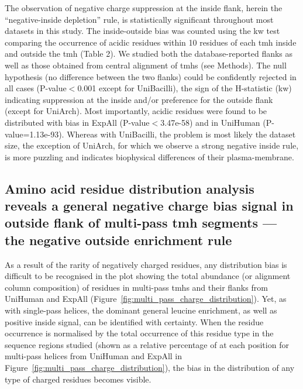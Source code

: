 The observation of negative charge suppression at the inside flank, herein the ``negative-inside depletion'' rule, is statistically significant throughout most datasets in this study. The inside-outside bias was counted using the \gls{kw} test comparing the occurrence of acidic residues within 10 residues of each \gls{tmh} inside and outside the \gls{tmh} (Table 2). We studied both the database-reported flanks as well as those obtained from central alignment of \gls{tmh}s (see Methods). The null hypothesis (no difference between the two flanks) could be confidently rejected in all cases (P-value$<$0.001 except for UniBacilli), the sign of the H-statistic (\gls{kw}) indicating suppression at the inside and/or preference for the outside flank (except for UniArch). Most importantly, acidic residues were found to be distributed with bias in ExpAll (P-value$<$3.47e-58) and in UniHuman (P-value=1.13e-93). Whereas with UniBacilli, the problem is most likely the dataset size, the exception of UniArch, for which we observe a strong negative inside rule, is more puzzling and indicates biophysical differences of their plasma-membrane.

\subsection{Amino acid residue distribution analysis reveals a general negative charge bias signal in outside flank of multi-pass \gls{tmh} segments --- the negative outside enrichment rule}

As a result of the rarity of negatively charged residues, any distribution bias is difficult to be recognised in the plot showing the total abundance (or alignment column composition) of residues in multi-pass \gls{tmh}s and their flanks from UniHuman and ExpAll (Figure~\ref{fig:multi_pass_charge_distribution}). Yet, as with single-pass helices, the dominant general leucine enrichment, as well as positive inside signal, can be identified with certainty. When the residue occurrence is normalised by the total occurrence of this residue type in the sequence regions studied (shown as a relative percentage of at each position for multi-pass helices from UniHuman and ExpAll  in Figure~\ref{fig:multi_pass_charge_distribution}), the bias in the distribution of any type of charged residues becomes visible.

